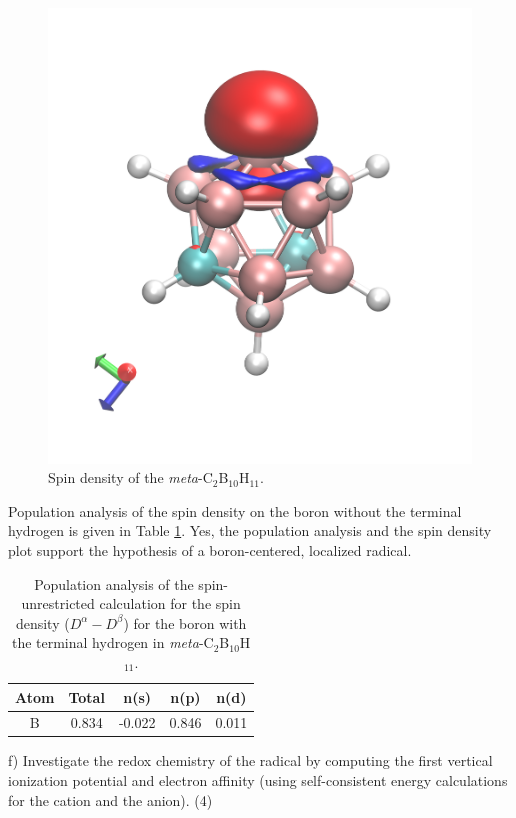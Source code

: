 \documentclass{article}
\begin{document}
\begin{figure}[H]
  \centering
  \includegraphics[scale=0.1]{spin_dens.png}
  \caption{Spin density of the \textit{meta}-C$_2$B$_{10}$H$_{11}$.}
  \label{fig:spin}
\end{figure}

{\color{blue} Population analysis of the spin density on the boron without
  the terminal hydrogen is given in Table \ref{tab:pop}. Yes, the population
  analysis and the spin density plot support the hypothesis of a boron-centered,
  localized radical.
}

\begin{table}[H]
  \centering
  \caption{Population analysis of the spin-unrestricted calculation
    for the spin density ($D^{\alpha}-D^{\beta}$) for the boron with the
    terminal hydrogen in \textit{meta}-C$_2$B$_{10}$H$_{11}$.}
  \begin{tabular}{ccccc}
    Atom & Total & n(s) & n(p) & n(d) \\
    \hline
    B & 0.834 & -0.022 & 0.846 & 0.011
  \end{tabular}
  \label{tab:pop}
\end{table}

\noindent f) Investigate the redox chemistry of the radical by computing
the first vertical ionization potential and electron affinity (using
self-consistent energy calculations for the cation and the anion). (4)
\\
\end{document}
